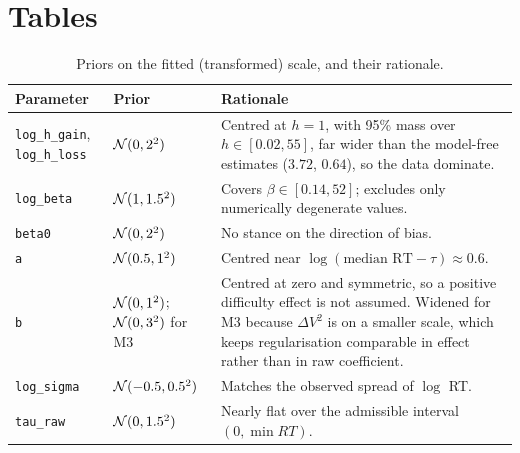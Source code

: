 \documentclass[11pt,a4paper]{article}
\begin{document}
\clearpage
\section*{Tables}

\begin{table}[H]\centering
\caption{Priors on the fitted (transformed) scale, and their rationale.}
\label{tab:priors}
\small
\begin{tabularx}{\textwidth}{llX}
\toprule
Parameter & Prior & Rationale\\
\midrule
\texttt{log\_h\_gain}, \texttt{log\_h\_loss} & $\mathcal{N}(0,2^2)$ & Centred at $h=1$, with 95\% mass over $h\in[0.02,55]$, far wider than the model-free estimates ($3.72$, $0.64$), so the data dominate.\\
\texttt{log\_beta} & $\mathcal{N}(1,1.5^2)$ & Covers $\beta\in[0.14,52]$; excludes only numerically degenerate values.\\
\texttt{beta0} & $\mathcal{N}(0,2^2)$ & No stance on the direction of bias.\\
\texttt{a} & $\mathcal{N}(0.5,1^2)$ & Centred near $\log(\text{median RT}-\tau)\approx0.6$.\\
\texttt{b} & $\mathcal{N}(0,1^2)$; $\mathcal{N}(0,3^2)$ for M3 & Centred at zero and symmetric, so a positive difficulty effect is not assumed. Widened for M3 because $\Delta V^2$ is on a smaller scale, which keeps regularisation comparable in effect rather than in raw coefficient.\\
\texttt{log\_sigma} & $\mathcal{N}(-0.5,0.5^2)$ & Matches the observed spread of $\log$ RT.\\
\texttt{tau\_raw} & $\mathcal{N}(0,1.5^2)$ & Nearly flat over the admissible interval $(0,\min RT)$.\\
\bottomrule
\end{tabularx}
\end{table}
\end{document}
